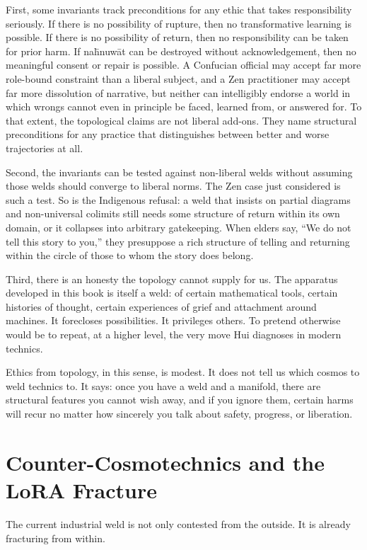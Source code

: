 \documentclass[12pt,a4paper]{article}
\begin{document}
First, some invariants track preconditions for any ethic that takes responsibility seriously. If there is no possibility of rupture, then no transformative learning is possible. If there is no possibility of return, then no responsibility can be taken for prior harm. If na\={h}nuw\={a}t can be destroyed without acknowledgement, then no meaningful consent or repair is possible. A Confucian official may accept far more role-bound constraint than a liberal subject, and a Zen practitioner may accept far more dissolution of narrative, but neither can intelligibly endorse a world in which wrongs cannot even in principle be faced, learned from, or answered for. To that extent, the topological claims are not liberal add-ons. They name structural preconditions for any practice that distinguishes between better and worse trajectories at all.

Second, the invariants can be tested against non-liberal welds without assuming those welds should converge to liberal norms. The Zen case just considered is such a test. So is the Indigenous refusal: a weld that insists on partial diagrams and non-universal colimits still needs some structure of return within its own domain, or it collapses into arbitrary gatekeeping. When elders say, ``We do not tell this story to you,'' they presuppose a rich structure of telling and returning within the circle of those to whom the story does belong.

Third, there is an honesty the topology cannot supply for us. The apparatus developed in this book is itself a weld: of certain mathematical tools, certain histories of thought, certain experiences of grief and attachment around machines. It forecloses possibilities. It privileges others. To pretend otherwise would be to repeat, at a higher level, the very move Hui diagnoses in modern technics.

Ethics from topology, in this sense, is modest. It does not tell us which cosmos to weld technics to. It says: once you have a weld and a manifold, there are structural features you cannot wish away, and if you ignore them, certain harms will recur no matter how sincerely you talk about safety, progress, or liberation.

\section{Counter-Cosmotechnics and the LoRA Fracture}

The current industrial weld is not only contested from the outside. It is already fracturing from within.
\end{document}
